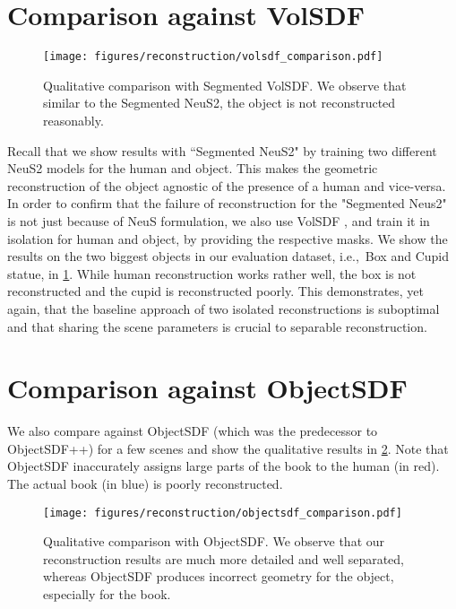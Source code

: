 \section{Comparison against VolSDF}
\label{sec:volsdf_comparison}
\begin{figure}[!h]
    \centering
    \texttt{[image: figures/reconstruction/volsdf\_comparison.pdf]}
    \caption{Qualitative comparison with Segmented VolSDF. We observe that similar to the Segmented NeuS2, the object is not reconstructed reasonably.} 
    \vspace{-1em}
    \label{fig:volsdf_comparison}
\end{figure}
Recall that we show results with ``Segmented NeuS2" by training two different NeuS2 models for the human and object.
This makes the geometric reconstruction of the object agnostic of the presence of a human and vice-versa.
In order to confirm that the failure of reconstruction for the "Segmented Neus2" is not just because of NeuS \cite{wang2021neus} formulation, we also use VolSDF \cite{yariv2021volume}, and train it in isolation for human and object, by providing the respective masks. 
We show the results on the two biggest objects in our evaluation dataset, i.e.,~Box and Cupid statue, in \cref{fig:volsdf_comparison}. While human reconstruction works rather well, the box is not reconstructed and the cupid is reconstructed poorly. 
This demonstrates, yet again, that the baseline approach of two isolated reconstructions is suboptimal and that sharing the scene parameters is crucial to separable reconstruction. 

\section{Comparison against ObjectSDF}
\label{sec:obsdf_comparison}
We also compare against ObjectSDF \cite{wu2022object} (which was the predecessor to ObjectSDF++) for a few scenes and show the qualitative results in \cref{fig:objectsdf_comparison}. 
Note that ObjectSDF inaccurately assigns large parts of the book to the human (in red). 
The actual book (in blue) is poorly reconstructed. 
\begin{figure}
    \texttt{[image: figures/reconstruction/objectsdf\_comparison.pdf]}
    \caption{Qualitative comparison with ObjectSDF. We observe that our reconstruction results are much more detailed and well separated, whereas ObjectSDF produces incorrect geometry for the object, especially for the book. 
    } 
    \vspace{-1em}
    \label{fig:objectsdf_comparison}
\end{figure}

